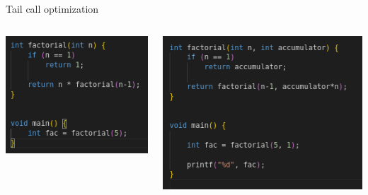 \documentclass{beamer}
\begin{document}
\begin{frame}{Tail call optimization}
\begin{columns}
\begin{column}{.4\textwidth}
    \includegraphics[width=\textwidth]{not_tco.png}
\end{column}
\begin{column}{.5\textwidth}
    \includegraphics[width=\textwidth]{tco_2.png}
\end{column}
\end{columns}
\end{frame}
\end{document}

